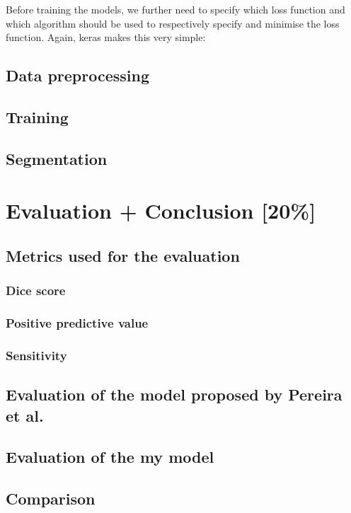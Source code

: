\documentclass[12pt,a4paper,twoside,openright]{report}
\begin{document}
Before training the models, we further need to specify which loss function and which algorithm should be used to respectively specify and minimise the loss function. Again, keras makes this very simple:


\section{Data preprocessing}

\section{Training}

\section{Segmentation}

\chapter{Evaluation + Conclusion [20\%]}

\section{Metrics used for the evaluation}
\subsection{Dice score}
\subsection{Positive predictive value}
\subsection{Sensitivity}

\section{Evaluation of the model proposed by Pereira et al.}
\section{Evaluation of the my model}
\section{Comparison}
\end{document}
